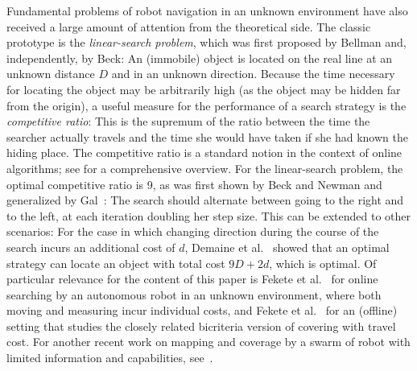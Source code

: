 Fundamental problems of robot navigation in an unknown environment have also received a large amount of attention from the theoretical side.
The classic prototype is the {\em linear-search problem}, which was first proposed by Bellman \cite{B63} and, independently,
by Beck\cite{B64}: An (immobile) object is located on the real line at an unknown distance $D$ and in an unknown direction.
Because the time necessary for locating the object may be arbitrarily high (as the object may be hidden far
from the origin), a useful measure for the performance of a search strategy
is the {\em competitive ratio}: This is the supremum of the ratio
between the time the searcher actually travels and the time she would have
taken if she had known the hiding place. 
 The competitive ratio is
a standard notion in the context of online algorithms; see \cite{FW98}
for a comprehensive overview. 
For the linear-search problem, the optimal competitive ratio is 9, as was first shown by Beck and Newman \cite{BN70} and generalized by Gal~\cite{G72,G74}: The search should alternate
between going to the right and to the left, at each iteration doubling her step size. This can be extended to other scenarios: For the case in which changing direction during the course 
of the search incurs an additional cost of $d$, Demaine et al.~\cite{dfg-olstc-06} showed that an optimal strategy can 
locate an object with total cost $9D+2d$, which is optimal.
Of particular relevance for the content of this paper is 
Fekete et al.~\cite{fkn-sar-04,fkn-osar-06} for online searching by an autonomous robot in an unknown environment,
where both moving and measuring incur individual costs, and Fekete et al.~\cite{fms-mctc-10} for an (offline)
setting that studies the closely related bicriteria version of covering with travel cost.
For another recent work on mapping and coverage by a swarm of robot with limited information and capabilities, see~\cite{lfm-stmrs-16}.

